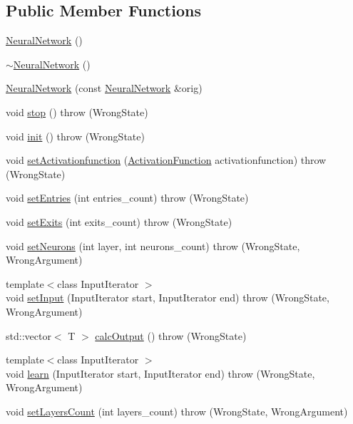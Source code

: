 \subsection*{\-Public \-Member \-Functions}
\begin{DoxyCompactItemize}
\item 
\hyperlink{class_neural_network_ade5d1724706351407fdf6acf613ac8c8}{\-Neural\-Network} ()
\item 
\hyperlink{class_neural_network_a4c1e3cc6dc0114260c17f0a5ea8e9981}{$\sim$\-Neural\-Network} ()
\item 
\hyperlink{class_neural_network_a4ce7e819f755461926a92668aab811e2}{\-Neural\-Network} (const \hyperlink{class_neural_network}{\-Neural\-Network} \&orig)
\item 
void \hyperlink{class_neural_network_aaf6e7c89c53dcc4f4b2c71f8d25a9741}{stop} ()  throw (\-Wrong\-State)
\item 
void \hyperlink{class_neural_network_aa83131836c86cd3e60ddb46a17b164a5}{init} ()  throw (\-Wrong\-State)
\item 
void \hyperlink{class_neural_network_acfdd9905e047fff1b40e4cd358160f6e}{set\-Activationfunction} (\hyperlink{class_activation_function}{\-Activation\-Function} activationfunction)  throw (\-Wrong\-State)
\item 
void \hyperlink{class_neural_network_a705286b62e4d1d11310f997dadd31fa8}{set\-Entries} (int entries\-\_\-count)  throw (\-Wrong\-State)
\item 
void \hyperlink{class_neural_network_a18912fbb8068bfb301d6e2462c9f8a31}{set\-Exits} (int exits\-\_\-count)  throw (\-Wrong\-State)
\item 
void \hyperlink{class_neural_network_ab3c70e006390624a5b9bd2c933b8af56}{set\-Neurons} (int layer, int neurons\-\_\-count)  throw (\-Wrong\-State, Wrong\-Argument)
\item 
{\footnotesize template$<$class Input\-Iterator $>$ }\\void \hyperlink{class_neural_network_aaf64536a908b15b76faa8e19216d9219}{set\-Input} (\-Input\-Iterator start, \-Input\-Iterator end)  throw (\-Wrong\-State, Wrong\-Argument)
\item 
std\-::vector$<$ \-T $>$ \hyperlink{class_neural_network_af7c28ad226f6d32d8c578159f0d03ae9}{calc\-Output} ()  throw (\-Wrong\-State)
\item 
{\footnotesize template$<$class Input\-Iterator $>$ }\\void \hyperlink{class_neural_network_a814f14ae36ecb286923f7fff6cff7aa7}{learn} (\-Input\-Iterator start, \-Input\-Iterator end)  throw (\-Wrong\-State, Wrong\-Argument)
\item 
void \hyperlink{class_neural_network_a3ef0490ade6f9efff49501132a12fd18}{set\-Layers\-Count} (int layers\-\_\-count)  throw (\-Wrong\-State, Wrong\-Argument)
\end{DoxyCompactItemize}


